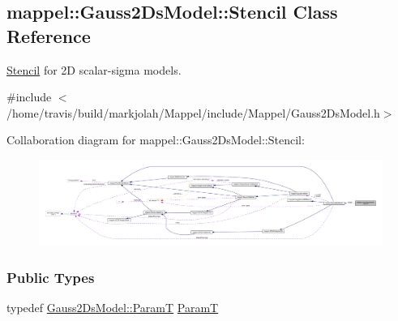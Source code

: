 \hypertarget{classmappel_1_1Gauss2DsModel_1_1Stencil}{}\subsection{mappel\+:\+:Gauss2\+Ds\+Model\+:\+:Stencil Class Reference}
\label{classmappel_1_1Gauss2DsModel_1_1Stencil}


\hyperlink{classmappel_1_1Gauss2DsModel_1_1Stencil}{Stencil} for 2D scalar-\/sigma models.  




{\ttfamily \#include $<$/home/travis/build/markjolah/\+Mappel/include/\+Mappel/\+Gauss2\+Ds\+Model.\+h$>$}



Collaboration diagram for mappel\+:\+:Gauss2\+Ds\+Model\+:\+:Stencil\+:\nopagebreak
\begin{figure}[H]
\begin{center}
\leavevmode
\includegraphics[width=350pt]{classmappel_1_1Gauss2DsModel_1_1Stencil__coll__graph}
\end{center}
\end{figure}
\subsubsection*{Public Types}
\begin{DoxyCompactItemize}
\item 
typedef \hyperlink{classmappel_1_1PointEmitterModel_a665ec6aea3aac139bb69a23c06d4b9a1}{Gauss2\+Ds\+Model\+::\+ParamT} \hyperlink{classmappel_1_1Gauss2DsModel_1_1Stencil_ab23d0622d37f67fb3079dcd7dad848fa}{ParamT}
\end{DoxyCompactItemize}
